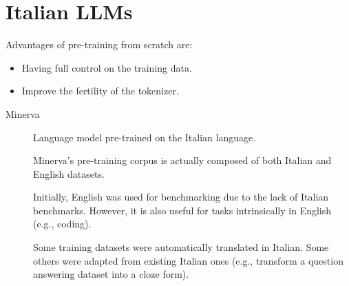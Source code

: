 \chapter{Italian LLMs}

\begin{remark}
    Advantages of pre-training from scratch are:
    \begin{itemize}
        \item Having full control on the training data.
        \item Improve the fertility of the tokenizer.
    \end{itemize} 
\end{remark}

\begin{description}
    \item[Minerva] 
        Language model pre-trained on the Italian language.

        \begin{remark}
            Minerva's pre-training corpus is actually composed of both Italian and English datasets.

            Initially, English was used for benchmarking due to the lack of Italian benchmarks. However, it is also useful for tasks intrinsically in English (e.g., coding).
        \end{remark}

        \begin{remark}
            Some training datasets were automatically translated in Italian. Some others were adapted from existing Italian ones (e.g., transform a question answering dataset into a cloze form).
        \end{remark}
\end{description}


